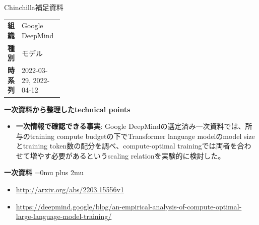 \begin{technicalnote}{Chinchilla}{補足資料}
\begingroup
\begin{tabularx}{\linewidth}{@{}>{\bfseries}p{0.22\linewidth}X@{}}
組織 & Google DeepMind \\
種別 & モデル \\
時系列 & 2022-03-29, 2022-04-12 \\
\end{tabularx}
\smallskip
{\bfseries 一次資料から整理したtechnical points}
\begin{itemize}[leftmargin=1.5em,itemsep=0.35em]
\item \textbf{一次情報で確認できる事実}: Google DeepMindの選定済み一次資料では、所与のtraining compute budgetの下でTransformer language modelのmodel sizeとtraining token数の配分を調べ、compute-optimal trainingでは両者を合わせて増やす必要があるというscaling relationを実験的に検討した。
\end{itemize}
\begin{minipage}{\linewidth}
\begin{samepage}
{\bfseries 一次資料}
\begingroup\sloppy
\Urlmuskip=0mu plus 2mu\relax
\begin{itemize}[leftmargin=1.5em,itemsep=0.25em]
\item {\scriptsize\url{http://arxiv.org/abs/2203.15556v1}}
\item {\scriptsize\url{https://deepmind.google/blog/an-empirical-analysis-of-compute-optimal-large-language-model-training/}}
\end{itemize}
\endgroup
\end{samepage}
\end{minipage}
\endgroup
\end{technicalnote}
\medskip

